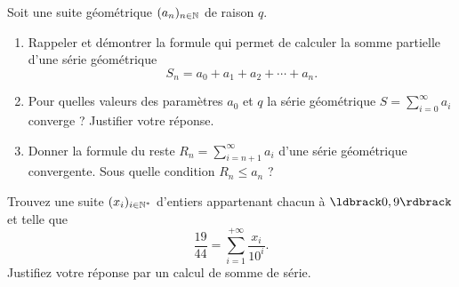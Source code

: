 \documentclass[a4paper,12pt,reqno]{amsart}
\begin{document}


\begin{exo} %

  Soit une suite géométrique $(a_{n})_{n \in \mathbb{N}}$ de raison $q$.
  \begin{enumerate}
    \item Rappeler et démontrer la formule qui permet de calculer la somme partielle d'une série géométrique
      \[
        S_{n}=a_{0}+a_{1}+a_{2}+\cdots+a_{n}.
      \]

    \item Pour quelles valeurs des paramètres $a_{0}$ et $q$ la série géométrique $S = \sum_{i=0}^{\infty} a_{i}$ converge ? Justifier votre réponse.

    \item Donner la formule du reste $R_{n} = \sum_{i=n+1}^{\infty} a_{i}$ d'une série géométrique convergente. Sous quelle condition $R_{n} \leq a_{n}$ ?
  \end{enumerate}

\end{exo}

\begin{exo} %

  Trouvez une suite $(x_i)_{i \in \mathbb{N}^*}$ d'entiers appartenant chacun à $\ldbrack 0,9 \rdbrack$ et telle que
    \[
      \frac{19}{44}=\sum_{i=1}^{+\infty}\frac{x_i}{10^i}.
    \]
  Justifiez votre réponse par un calcul de somme de série.

\end{exo}
\end{document}
